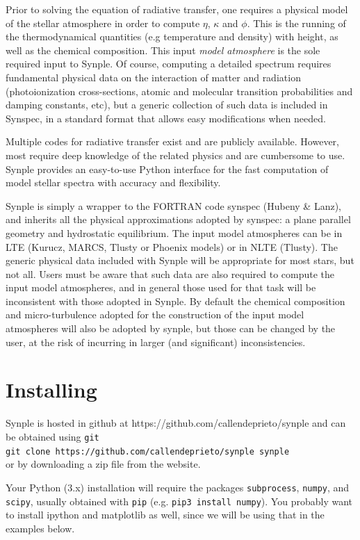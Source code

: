 \documentclass[]{article}
\begin{document}
Prior to solving the equation of radiative transfer, one requires a physical model of the stellar atmosphere in order to compute $\eta$, $\kappa$ and $\phi$. This is the running of the thermodynamical quantities (e.g temperature and density) with height, as well as the chemical composition. This input {\it model atmosphere} is the sole required input to Synple.  Of course, computing a detailed spectrum requires fundamental physical data on the interaction of matter and radiation (photoionization cross-sections, atomic and molecular transition probabilities and damping constants, etc), but a generic collection of such data is included in Synspec, in a standard format that allows easy modifications when  needed.

Multiple codes for radiative transfer exist and are publicly available. However, most require deep knowledge of the related physics and are cumbersome to use. Synple provides an easy-to-use Python interface for the fast computation of model stellar spectra with accuracy and flexibility.

Synple is simply a wrapper to the FORTRAN code synspec (Hubeny \& Lanz), and inherits all the physical approximations adopted by synspec: a plane parallel geometry and hydrostatic equilibrium. The input model atmospheres can be in LTE (Kurucz, MARCS, Tlusty or Phoenix models) or in NLTE (Tlusty). The generic physical data included with Synple will be appropriate for most stars, but not all. Users must be aware that such data are also required to compute the  input model atmospheres, and in general those used for that task will be inconsistent with those adopted in Synple.  By default the chemical composition and micro-turbulence adopted for the construction of the input model atmospheres will also be adopted by synple, but those can be changed by the user, at the risk of incurring in larger (and significant) inconsistencies.

\section{Installing}

Synple is hosted in github at https://github.com/callendeprieto/synple
and can be obtained using {\tt git} 
\\ {\tt git clone https://github.com/callendeprieto/synple synple} \\
\noindent or by downloading a zip file from the website.

Your Python (3.x) installation  will require the packages {\tt subprocess}, {\tt numpy}, and {\tt scipy}, usually obtained with {\tt pip} (e.g. {\tt pip3 install numpy}). You probably want to install ipython and matplotlib as well, since we will be using that in the examples below. 
\end{document}
